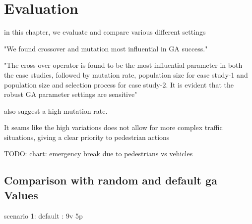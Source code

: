 \chapter{Evaluation}
\label{chap:evaluation}
in this chapter, we evaluate and compare various different settings

"We found crossover and mutation most influential in GA success."\cite{mills_determining_2015}

"The cross over operator is found to be the most influential parameter in both the case studies, followed by mutation rate, population size for case study-1 and population size and selection process for case study-2. It is evident that the robust GA parameter settings are sensitive"\cite{majumdar_genetic_2015}

\cite{boyabatli_parameter_2004} also suggest a high mutation rate.



It seams like the high variations does not allow for more complex traffic situations, giving a clear priority to pedestrian actions

TODO: chart: emergency break due to pedestrians vs vehicles

\section{Comparison with random and default ga Values}
scenario 1: default : 9v 5p


